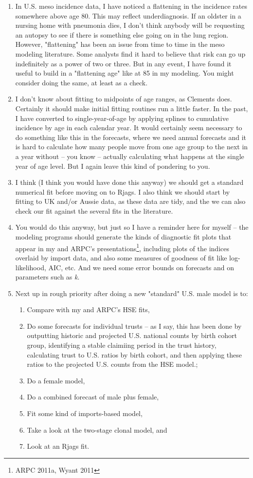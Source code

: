 \documentclass{article}\usepackage{graphicx, color}
\begin{document}
\begin{enumerate}
  \item In U.S. meso incidence data, I have noticed a flattening in the incidence rates somewhere above age 80.  This may reflect underdiagnosis.  If an oldster in a nursing home with pneumonia dies, I don't think anybody will be requesting an autopsy to see if there is something else going on in the lung region.  However, "flattening" has been an issue from time to time in the meso modeling literature.  Some analysts find it hard to believe that risk can go up indefinitely as a power of two or three.  But in any event, I have found it useful to build in a "flattening age" like at 85 in my modeling. You might consider doing the same, at least as a check.
  \item I don't know about fitting to midpoints of age ranges, as Clements does.  Certainly it should make initial fitting routines run a little faster.  In the past, I have converted to single-year-of-age by applying splines to cumulative incidence by age in each calendar year.  It would certainly seem necessary to do something like this in the forecasts, where we need annual forecasts and it is hard to calculate how many people move from one age group to the next in a year without -- you know -- actually calculating what happens at the single year of age level.  But I again leave this kind of pondering to you. 
  \item I think (I think you would have done this anyway) we should get a standard numerical fit before moving on to Rjags.  I also think we should start by fitting to UK and/or Aussie data, as these data are tidy, and the we can also check our fit against the several fits in the literature.
  \item You would do this anyway, but just so I have a reminder here for myself -- the modeling programs should generate the kinds of diagnostic fit plots that appear in my and ARPC's presentations\footnote{ARPC 2011a, Wyant 2011}, including plots of the indices overlaid by import data, and also some measures of goodness of fit like log-likelihood, AIC, etc.  And we need some error bounds on forecasts and on parameters such as \emph{k}.
  \item Next up in rough priority after doing a new "standard" U.S. male model is to:
  \begin{enumerate}
  \item Compare with my and ARPC's HSE fits,
  \item Do some forecasts for individual trusts -- as I say, this has been done by outputting historic and projected U.S. national counts by birth cohort group, identifying a stable claimiing period in the trust history, calculating trust to U.S. ratios by birth cohort, and then applying these ratios to the projected U.S. counts from the HSE model.;
  \item Do a female model,
  \item Do a combined forecast of male plus female,
  \item Fit some kind of imports-based model,
  \item Take a look at the two-stage clonal model, and
  \item Look at an Rjags fit.
\end{enumerate}

\end{enumerate}
\end{document}
